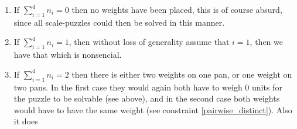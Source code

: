 \begin{enumerate}
\item If $\sum_{i=1}^{4} n_i = 0$ then no weights have been placed, this is of course absurd, since all scale-puzzles could then be solved in this manner.
\item If $\sum_{i=1}^{4} n_i = 1$, then without loss of generality assume that $i = 1$, then we have that 
which is nonsencial.
\item If $\sum_{i=1}^{4} n_i = 2$ then there is either two weights on one pan, or one weight on two pans. In the first case they would again both have to weigh 0 units for the puzzle to be solvable (see above), and in the second case both weights would have to have the same weight (see constraint \ref{pairwise_distinct}). Also it does 
\end{enumerate}
